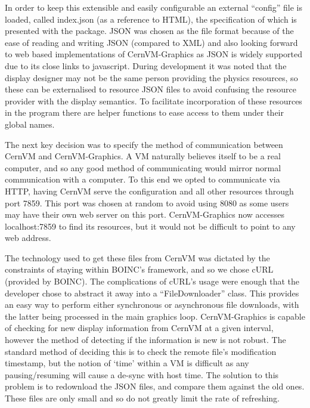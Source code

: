 \documentclass[twocolumn,aps]{revtex4}
\newcommand{\cernvm}{CernVM}
\newcommand{\cernvmgraphics}{\cernvm{}-Graphics}
\newcommand{\boinc}{BOINC}
\newcommand{\curl}{cURL}
\newcommand{\json}{JSON}
\newcommand{\vmport}{7859}
\begin{document}
    In order to keep this extensible and easily configurable an external
    ``config'' file is loaded, called index.json (as a reference to HTML),
    the specification of which is presented with the package.  \json{} was 
    chosen as the file format because of the ease of reading and writing 
    \json{} (compared to XML) and also looking forward to web based 
    implementations of \cernvmgraphics{} as \json{} is widely supported due 
    to its close links to javascript. During development it was noted that
    the display designer may not be the same person providing the physics
    resources, so these can be externalised to resource \json{} files to
    avoid confusing the resource provider with the display semantics.
    To facilitate incorporation of these resources in the program there are 
    helper functions to ease access to them under their global names.

    The next key decision was to specify the method of communication
    between \cernvm{} and \cernvmgraphics{}. A VM naturally believes itself
    to be a real computer, and so any good method of communicating would 
    mirror normal communication with a computer. To this end we opted to
    communicate via HTTP, having \cernvm{} serve the configuration and all
    other resources through port \vmport{}. This port was chosen at random
    to avoid using 8080 as some users may have their own web server on this
    port. \cernvmgraphics{} now accesses localhost:\vmport{} to find its
    resources, but it would not be difficult to point to any web address.

    The technology used to get these files from \cernvm{} was dictated by
    the constraints of staying within \boinc{}'s framework, and so we chose
    \curl{} (provided by \boinc{}). The complications of \curl{}'s usage
    were enough that the developer chose to abstract it away into a
    ``FileDownloader'' class. This provides an easy way to perform either
    synchronous or asynchronous file downloads, with the latter being
    processed in the main graphics loop. \cernvmgraphics{} is capable of 
    checking for new display information from \cernvm{} at a given interval,
    however the method of detecting if the information is new is not robust.
    The standard method of deciding this is to check the remote file's
    modification timestamp, but the notion of `time' within a VM is 
    difficult as any pausing/resuming will cause a de-sync with host time. 
    The solution to this problem is to redownload the \json{} files, and
    compare them against the old ones. These files are only small and so do
    not greatly limit the rate of refreshing.
\end{document}
